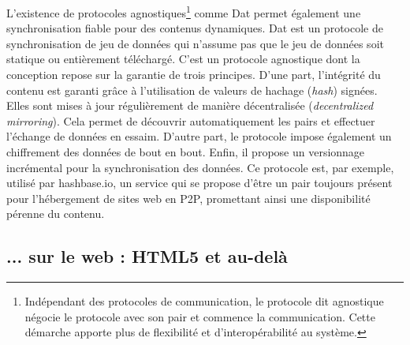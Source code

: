 L'existence de protocoles agnostiques\footnote{Indépendant des 
protocoles de communication, le protocole dit \og agnostique\fg{} négocie le 
protocole avec son pair et commence la communication. Cette démarche 
apporte plus de flexibilité et d'interopérabilité au système.} comme Dat 
\cite{Ogden2017} permet également une synchronisation fiable pour des 
contenus dynamiques. Dat est un protocole de synchronisation de jeu de données 
qui n'assume pas que le jeu de données soit statique ou entièrement téléchargé. 
C'est un protocole agnostique dont la conception repose sur la garantie de 
trois principes. D'une part, l'intégrité du contenu est garanti grâce à 
l'utilisation de valeurs de hachage (\textit{hash}) signées. Elles sont 
mises à jour régulièrement de manière décentralisée (\textit{decentralized mirroring}). 
Cela permet de découvrir automatiquement les pairs et effectuer l'échange de 
données en essaim. D'autre part, le protocole impose également un chiffrement
des données de bout en bout. Enfin, il propose un versionnage incrémental pour la 
synchronisation des données. Ce protocole est, par exemple, utilisé par 
hashbase.io, un service qui se propose d'être un pair toujours présent pour 
l'hébergement de sites web en \gls{P2P}, promettant ainsi une disponibilité 
pérenne du contenu. 


\subsection{... sur le web : HTML5 et au-delà}


